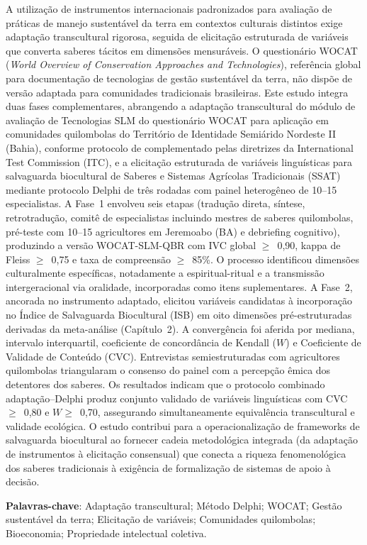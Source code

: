 {\renewcommand{\PRIVATEbookmarkthis}[1]{}%
\begin{resumoumacoluna}
A utilização de instrumentos internacionais padronizados para avaliação de práticas de manejo sustentável da terra em contextos culturais distintos exige adaptação transcultural rigorosa, seguida de elicitação estruturada de variáveis que converta saberes tácitos em dimensões mensuráveis. O questionário WOCAT (\textit{World Overview of Conservation Approaches and Technologies}), referência global para documentação de tecnologias de gestão sustentável da terra, não dispõe de versão adaptada para comunidades tradicionais brasileiras. Este estudo integra duas fases complementares, abrangendo a adaptação transcultural do módulo de avaliação de Tecnologias SLM do questionário WOCAT para aplicação em comunidades quilombolas do Território de Identidade Semiárido Nordeste II (Bahia), conforme protocolo de  complementado pelas diretrizes da International Test Commission (ITC), e a elicitação estruturada de variáveis linguísticas para salvaguarda biocultural de Saberes e Sistemas Agrícolas Tradicionais (SSAT) mediante protocolo Delphi de três rodadas com painel heterogêneo de 10--15 especialistas. A Fase~1 envolveu seis etapas (tradução direta, síntese, retrotradução, comitê de especialistas incluindo mestres de saberes quilombolas, pré-teste com 10--15 agricultores em Jeremoabo (BA) e debriefing cognitivo), produzindo a versão WOCAT-SLM-QBR com IVC global $\geq$~0,90, kappa de Fleiss $\geq$~0,75 e taxa de compreensão $\geq$~85\%. O processo identificou dimensões culturalmente específicas, notadamente a espiritual-ritual e a transmissão intergeracional via oralidade, incorporadas como itens suplementares. A Fase~2, ancorada no instrumento adaptado, elicitou variáveis candidatas à incorporação no Índice de Salvaguarda Biocultural (ISB) em oito dimensões pré-estruturadas derivadas da meta-análise (Capítulo~2). A convergência foi aferida por mediana, intervalo interquartil, coeficiente de concordância de Kendall ($W$) e Coeficiente de Validade de Conteúdo (CVC). Entrevistas semiestruturadas com agricultores quilombolas triangularam o consenso do painel com a percepção êmica dos detentores dos saberes. Os resultados indicam que o protocolo combinado adaptação--Delphi produz conjunto validado de variáveis linguísticas com CVC~$\geq$~0,80 e $W \geq$~0,70, assegurando simultaneamente equivalência transcultural e validade ecológica. O estudo contribui para a operacionalização de frameworks de salvaguarda biocultural ao fornecer cadeia metodológica integrada (da adaptação de instrumentos à elicitação consensual) que conecta a riqueza fenomenológica dos saberes tradicionais à exigência de formalização de sistemas de apoio à decisão.

\vspace{\onelineskip}
\noindent
\textbf{Palavras-chave}: Adaptação transcultural; Método Delphi; WOCAT; Gestão sustentável da terra; Elicitação de variáveis; Comunidades quilombolas; Bioeconomia; Propriedade intelectual coletiva.
\end{resumoumacoluna}}

